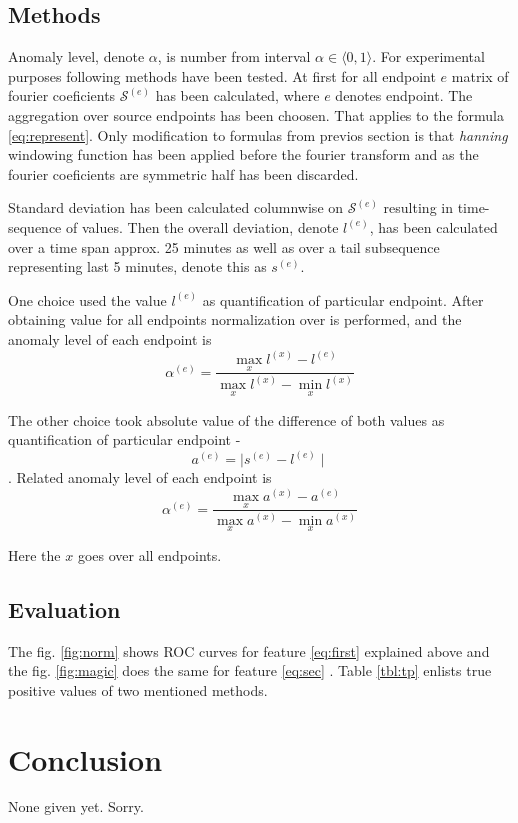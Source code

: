 \documentclass[a4paper,journal]{IEEEtran}
\begin{document}
\subsection{Methods}
Anomaly level, denote $\alpha$, is number from interval $\alpha \in \langle0, 1\rangle$.
For experimental purposes following methods have been tested.
At first for all endpoint $e$ matrix of fourier coeficients $\mathcal{S}^{(e)}$ has been calculated, 
where $e$ denotes endpoint. 
The aggregation over source endpoints has been choosen. That
applies to the formula \ref{eq:represent}.
Only modification to formulas from previos section is that \textit{hanning} windowing function
has been  applied before the fourier transform and as the fourier coeficients are symmetric 
half has been discarded.

Standard deviation  has been calculated columnwise on $\mathcal{S}^{(e)}$ resulting in time-sequence of values.
Then the overall deviation, denote $l^{(e)} $, has been calculated over a time span approx. 25 minutes
as well as over a tail subsequence representing last 5 minutes, denote this as $s^{(e)} $.

One choice used the value $l^{(e)} $ as quantification of particular endpoint.
After obtaining value for all endpoints normalization over is performed, and the anomaly level of each endpoint is
\begin{equation}\label{eq:first}
\alpha^{(e)} = \frac{\max_x l^{(x)} - l^{(e)}}{\max_x l^{(x)} - \min_x l^{(x)}} 
\end{equation}

The other choice took absolute value   of the difference of both values
as quantification of particular endpoint - 
\[a^{(e)} = \mid s^{(e)} - l^{(e)} \mid \].
Related anomaly level of each endpoint is
\begin{equation}\label{eq:sec}
\alpha^{(e)} = \frac{\max_x a^{(x)} - a^{(e)}}{\max_x a^{(x)} - \min_x a^{(x)}}
\end{equation}

Here the $x$ goes over all endpoints.

\subsection{Evaluation}
The {fig. \ref{fig:norm}} shows ROC curves for feature \ref{eq:first} explained above and the {fig. \ref{fig:magic}} 
does the same for feature \ref{eq:sec} . Table \ref{tbl:tp} enlists true positive values of two mentioned methods.

\section{Conclusion}
None given yet. Sorry.
\end{document}
